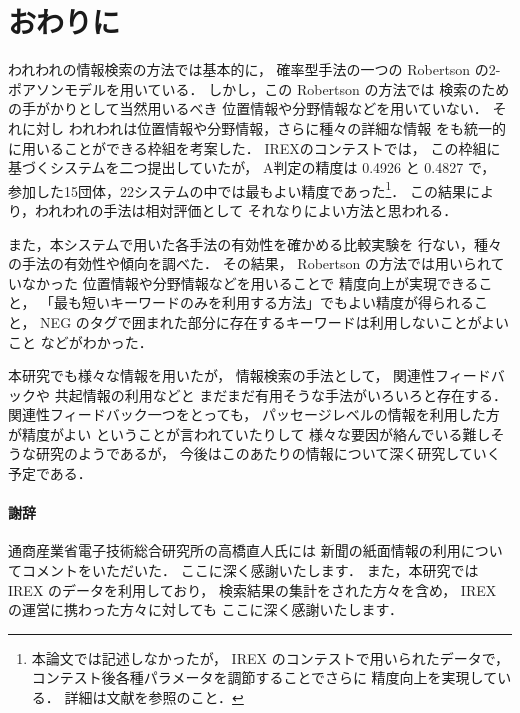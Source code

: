 \section{おわりに}
われわれの情報検索の方法では基本的に，
確率型手法の一つの Robertson の2-ポアソンモデルを用いている．
しかし，この Robertson の方法では
検索のための手がかりとして当然用いるべき
位置情報や分野情報などを用いていない．
それに対し
われわれは位置情報や分野情報，さらに種々の詳細な情報
をも統一的に用いることができる枠組を考案した．
IREXのコンテストでは，
この枠組に基づくシステムを二つ提出していたが，
A判定の精度は 0.4926 と 0.4827 で，
参加した15団体，22システムの中では最もよい精度であった\footnote{本論文では記述しなかったが，
IREX のコンテストで用いられたデータで，
コンテスト後各種パラメータを調節することでさらに
精度向上を実現している．
詳細は文献\cite{irex1_IR}を参照のこと．}．
この結果により，われわれの手法は相対評価として
それなりによい方法と思われる．

また，本システムで用いた各手法の有効性を確かめる比較実験を
行ない，種々の手法の有効性や傾向を調べた．
その結果， Robertson の方法では用いられていなかった
位置情報や分野情報などを用いることで
精度向上が実現できること，
「最も短いキーワードのみを利用する方法」でもよい精度が得られること，
NEG のタグで囲まれた部分に存在するキーワードは利用しないことがよいこと
などがわかった．

本研究でも様々な情報を用いたが，
情報検索の手法として，
関連性フィードバック\cite{Sakai99}や
共起情報の利用\cite{Takaki99}などと
まだまだ有用そうな手法がいろいろと存在する．
関連性フィードバック一つをとっても，
パッセージレベルの情報を利用した方が精度がよい\cite{Matsushita_IREX}
ということが言われていたりして
様々な要因が絡んでいる難しそうな研究のようであるが，
今後はこのあたりの情報について深く研究していく予定である．

\paragraph*{謝辞}
通商産業省電子技術総合研究所の高橋直人氏には
新聞の紙面情報の利用についてコメントをいただいた．
ここに深く感謝いたします．
また，本研究では IREX のデータを利用しており，
検索結果の集計をされた方々を含め，
IREX の運営に携わった方々に対しても
ここに深く感謝いたします．






